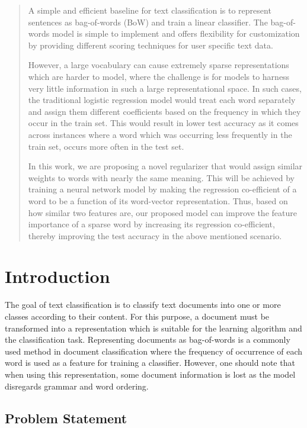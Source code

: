 \begin{abstract}
A simple and efficient baseline for text classification is to represent sentences as bag-of-words (BoW) and train a linear classifier. The bag-of-words model is simple to implement and offers flexibility for customization by providing different scoring techniques for user specific text data.

However, a large vocabulary can cause extremely sparse representations which are harder to model, where the challenge is for models to harness very little information in such a large representational space. In such cases, the traditional logistic regression model would treat each word separately and assign them different coefficients based on the frequency in which they occur in the train set. This would result in lower test accuracy as it comes across instances where a word which was occurring less frequently in the train set, occurs more often in the test set.

In this work, we are proposing a novel regularizer that would assign similar weights to words with nearly the same meaning. This will be achieved by training a neural network model by making the regression co-efficient of a word to be a function of its word-vector representation. Thus, based on how similar two features are, our proposed model can improve the feature importance of a sparse word by increasing its regression co-efficient, thereby improving the test accuracy in the above mentioned scenario.

\end{abstract}

\chapter{Introduction}

The goal of text classification is to classify text documents into one or more classes according to their content. For this purpose, a document must be transformed into a representation which is suitable for the learning algorithm and the classification task. Representing documents as bag-of-words is a commonly used method in document classification where the frequency of occurrence of each word is used as a feature for training a classifier. However, one should note that when using this representation, some document information is lost as the model disregards grammar and word ordering.

\section{Problem Statement}

